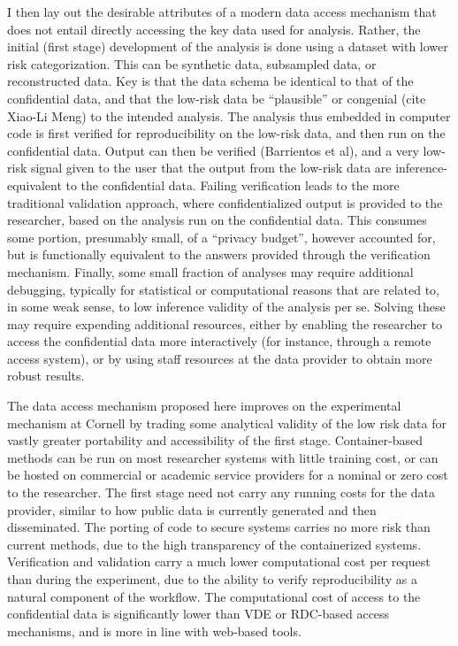 \documentclass[12pt,titlepage]{article}
\begin{document}
I then lay out the desirable attributes of a modern data access mechanism that does not entail directly accessing the key data used for analysis. Rather, the initial (first stage) development of the analysis is done using a dataset with lower risk categorization. This can be synthetic data, subsampled data, or reconstructed data. Key is that the data schema be identical to that of the confidential data, and that the low-risk data be ``plausible'' or congenial (cite Xiao-Li Meng) to the intended analysis. The analysis thus embedded in computer code is first verified for reproducibility on the low-risk data, and then run on the confidential data. Output can then be verified (Barrientos et al), and a very low-risk signal given to the user that the output from the low-risk data are inference-equivalent to the confidential data. Failing verification leads to the more traditional validation approach, where confidentialized output is provided to the researcher, based on the analysis run on the confidential data. This consumes some portion, presumably small, of a ``privacy budget'', however accounted for, but is functionally equivalent to the answers provided through the verification mechanism. Finally, some small fraction of analyses may require additional debugging, typically for statistical or computational reasons that are related to, in some weak sense, to low inference validity of the analysis per se. Solving these may require expending additional resources, either by enabling the researcher to access the confidential data more interactively (for instance, through a remote access system), or by using staff resources at the data provider to obtain more robust results.

The data access mechanism proposed here improves on the experimental mechanism at Cornell by trading some analytical validity of the low risk data for vastly greater portability and accessibility of the first stage. Container-based methods can be run on most researcher systems with little training cost, or can be hosted on commercial or academic service providers for a nominal or zero cost to the researcher. The first stage need not carry any running costs for the data provider, similar to how public data is currently generated and then disseminated. The porting of code to secure systems carries no more risk than current methods, due to the high transparency of the containerized systems. Verification and validation carry a much lower computational cost per request than during the experiment, due to the ability to verify reproducibility as a natural component of the workflow.  The computational cost of access to the confidential data is significantly lower than VDE or RDC-based access mechanisms, and is more in line with web-based tools. 
\end{document}
